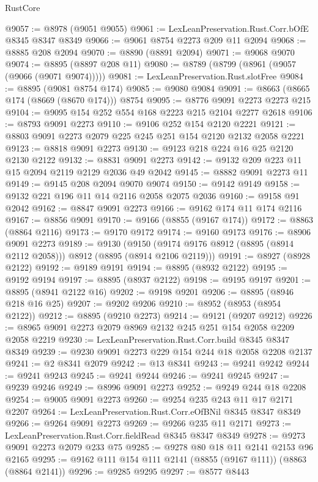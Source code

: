\begin{lexlean}{RustCore}
\begin{coremodule}
@9057 := @8978 (@9051 @9055)
@9061 := LexLeanPreservation.Rust.Corr.bOfE @8345 @8347 @8349
@9066 := @9061 @8754 @2273 @209 @11 @2094
@9068 := @8885 @208 @2094
@9070 := @8890 (@8891 @2094)
@9071 := @9068 @9070
@9074 := @8895 (@8897 @208 @11)
@9080 := @8789 (@8799 (@8961 (@9057 (@9066 (@9071 @9074)))))
@9081 := LexLeanPreservation.Rust.slotFree
@9084 := @8895 (@9081 @8754 @174)
@9085 := @9080 @9084
@9091 := @8663 (@8665 @174 (@8669 (@8670 @174))) @8754
@9095 := @8776 @9091 @2273 @2273 @215
@9104 := @9095 @154 @252 @554 @168 @2223 @215 @2104 @2277 @2618
@9106 := @8793 @9091 @2273
@9110 := @9106 @252 @154 @2120 @2221
@9121 := @8803 @9091 @2273 @2079 @225 @245 @251 @154 @2120 @2132 @2058 @2221
@9123 := @8818 @9091 @2273
@9130 := @9123 @218 @224 @16 @25 @2120 @2130 @2122
@9132 := @8831 @9091 @2273
@9142 := @9132 @209 @223 @11 @15 @2094 @2119 @2129 @2036 @49 @2042
@9145 := @8882 @9091 @2273 @11
@9149 := @9145 @208 @2094 @9070 @9074
@9150 := @9142 @9149
@9158 := @9132 @221 @196 @11 @14 @2116 @2058 @2075 @2036
@9160 := @9158 @91 @2042
@9162 := @8847 @9091 @2273
@9166 := @9162 @174 @11 @174 @2116
@9167 := @8856 @9091
@9170 := @9166 (@8855 (@9167 @174))
@9172 := @8863 (@8864 @2116)
@9173 := @9170 @9172
@9174 := @9160 @9173
@9176 := @8906 @9091 @2273
@9189 := @9130
    (@9150 (@9174 @9176 @8912 (@8895 (@8914 @2112 @2058))) @8912 (@8895 (@8914 @2106 @2119)))
@9191 := @8927 (@8928 @2122)
@9192 := @9189 @9191
@9194 := @8895 (@8932 @2122)
@9195 := @9192 @9194
@9197 := @8895 (@8937 @2122)
@9198 := @9195 @9197
@9201 := @8895 (@8941 @2122 @16)
@9202 := @9198 @9201
@9206 := @8895 (@8946 @218 @16 @25)
@9207 := @9202 @9206
@9210 := @8952 (@8953 (@8954 @2122))
@9212 := @8895 (@9210 @2273)
@9214 := @9121 (@9207 @9212)
@9226 := @8965 @9091 @2273 @2079 @8969 @2132 @245 @251 @154 @2058 @2209 @2058 @2219
@9230 := LexLeanPreservation.Rust.Corr.build @8345 @8347 @8349
@9239 := @9230 @9091 @2273 @229 @154 @244 @18 @2058 @2208 @2137
@9241 := @2 @8341 @2079
@9242 := @13 @8341
@9243 := @9241 @9242
@9244 := @9241 @9243
@9245 := @9241 @9244
@9246 := @9241 @9245
@9247 := @9239 @9246
@9249 := @8996 @9091 @2273
@9252 := @9249 @244 @18 @2208
@9254 := @9005 @9091 @2273
@9260 := @9254 @235 @243 @11 @17 @2171 @2207
@9264 := LexLeanPreservation.Rust.Corr.eOfBNil @8345 @8347 @8349
@9266 := @9264 @9091 @2273
@9269 := @9266 @235 @11 @2171
@9273 := LexLeanPreservation.Rust.Corr.fieldRead @8345 @8347 @8349
@9278 := @9273 @9091 @2273 @2079 @233 @75
@9285 := @9278 @80 @18 @11 @2141 @2153 @96 @2165
@9295 := @9162 @111 @154 @111 @2141 (@8855 (@9167 @111)) (@8863 (@8864 @2141))
@9296 := @9285 @9295
@9297 := @8577 @8443

\end{coremodule}
\end{lexlean}
